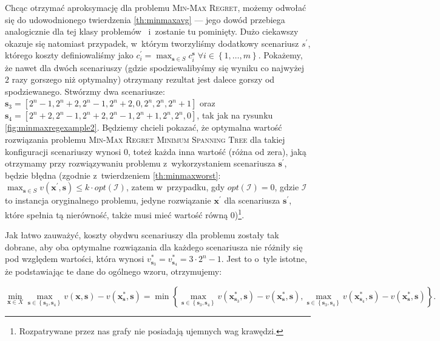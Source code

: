Chcąc otrzymać aproksymację dla problemu \textsc{Min-Max Regret}, możemy odwołać się do udowodnionego twierdzenia \ref{th:minmaxavg} --- jego dowód przebiega analogicznie dla tej klasy problemów~\cite[propozycja $1$]{minmaxSurvey} i~zostanie tu pominięty.
Dużo ciekawszy okazuje się natomiast przypadek, w~którym tworzyliśmy dodatkowy scenariusz $s^{\prime}$, którego koszty definiowaliśmy jako $c^{\prime}_{i} = \max_{\textbf{s} \in S} c^{\textbf{s}}_{i} \; \forall i \in \left\{ 1, \dots, m \right\}$.
Pokażemy, że nawet dla dwóch scenariuszy (gdzie spodziewalibyśmy się wyniku co najwyżej $2$ razy gorszego niż optymalny) otrzymany rezultat jest dalece gorszy od spodziewanego.
Stwórzmy dwa scenariusze: $\textbf{s}_{3} = \left[ 2^{n} - 1, 2^{n} + 2, 2^{n} - 1, 2^{n} + 2, 0, 2^{n}, 2^{n}, 2^{n} + 1 \right]$ oraz $\textbf{s}_{4} = \left[ 2^{n} + 2, 2^{n} - 1, 2^{n} + 2, 2^{n} - 1, 2^{n} + 1, 2^{n}, 2^{n}, 0 \right]$, tak jak na rysunku \ref{fig:minmaxregexample2}.
Będziemy chcieli pokazać, że optymalna wartość rozwiązania problemu \textsc{Min-Max Regret Minimum Spanning Tree} dla takiej konfiguracji scenariuszy wynosi $0$, toteż każda inna wartość (różna od zera), jaką otrzymamy przy rozwiązywaniu problemu z~wykorzystaniem scenariusza $\textbf{s}^{\prime}$, będzie błędna (zgodnie z~twierdzeniem \ref{th:minmaxworst}: $\max_{\textbf{s} \in S} v \left( \textbf{x}^{\prime}, \textbf{s} \right) \leqslant k \cdot opt \left( \mathcal{I} \right)$, zatem w~przypadku, gdy $opt \left( \mathcal{I} \right) = 0$, gdzie $\mathcal{I}$ to instancja oryginalnego problemu, jedyne rozwiązanie $\textbf{x}^{\prime}$ dla scenariusza $\textbf{s}^{\prime}$, które spełnia tą nierówność, także musi mieć wartość równą $0$)\footnote{
	Rozpatrywane przez nas grafy nie posiadają ujemnych wag krawędzi.
}. 

Jak łatwo zauważyć, koszty obydwu scenariuszy dla problemu zostały tak dobrane, aby oba optymalne rozwiązania dla każdego scenariusza nie różniły się pod względem wartości, która wynosi $v^{\ast}_{\textbf{s}_{3}} = v^{\ast}_{\textbf{s}_{4}} = 3 \cdot 2^{n} - 1$.
Jest to o~tyle istotne, że podstawiając te dane do ogólnego wzoru, otrzymujemy:

\begin{equation}\label{eq:minmaxreg}
	\min_{\textbf{x} \in X} \max_{\textbf{s} \in \left\{ \textbf{s}_{3}, \textbf{s}_{4} \right\}} v \left( \textbf{x}, \textbf{s} \right) - v \left( \textbf{x}^{\ast}_{\textbf{s}}, \textbf{s} \right) = \min \left\{   \max_{\textbf{s} \in \left\{ \textbf{s}_{3}, \textbf{s}_{4} \right\}} v \left( \textbf{x}^{\ast}_{\textbf{s}_{3}}, \textbf{s} \right) - v \left( \textbf{x}^{\ast}_{\textbf{s}}, \textbf{s} \right), \max_{\textbf{s} \in \left\{ \textbf{s}_{3}, \textbf{s}_{4} \right\}} v \left( \textbf{x}^{\ast}_{\textbf{s}_{4}}, \textbf{s} \right) - v \left( \textbf{x}^{\ast}_{\textbf{s}}, \textbf{s} \right) \right\}\text{.}
\end{equation}

